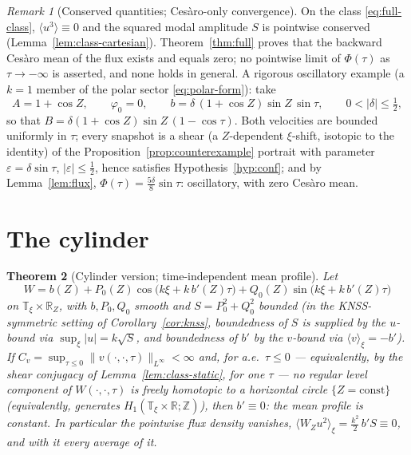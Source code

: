 \documentclass[11pt]{amsart}
\newtheorem{theorem}{Theorem}[section]
\theoremstyle{definition}
\theoremstyle{remark}
\newtheorem{remark}[theorem]{Remark}
\newcommand{\T}{\mathbb{T}}
\newcommand{\R}{\mathbb{R}}
\newcommand{\mean}[1]{\langle #1\rangle}
\begin{document}
\begin{remark}[Conserved quantities; Ces\`aro-only convergence]
\label{rem:consistency}
On the class \eqref{eq:full-class}, $\mean{u^3}\equiv0$ and the squared
modal amplitude $S$ is pointwise conserved (Lemma~\ref{lem:class-cartesian}).
Theorem~\ref{thm:full} proves that the backward Ces\`aro mean of the
flux exists and equals zero; no pointwise limit of $\Phi(\tau)$ as
$\tau\to-\infty$ is asserted, and none holds in general. A rigorous
oscillatory example (a $k=1$ member of the polar sector
\eqref{eq:polar-form}): take
\[
  A=1+\cos Z,\qquad \varphi_0=0,\qquad
  b=\delta\,(1+\cos Z)\sin Z\,\sin\tau,\qquad
  0<|\delta|\le\tfrac12 ,
\]
so that $B=\delta(1+\cos Z)\sin Z\,(1-\cos\tau)$. Both velocities are
bounded uniformly in $\tau$; every snapshot is a shear (a
$Z$-dependent $\xi$-shift, isotopic to the identity) of the
Proposition~\ref{prop:counterexample} portrait with parameter
$\varepsilon=\delta\sin\tau$, $|\varepsilon|\le\tfrac12$, hence
satisfies Hypothesis~\ref{hyp:conf}; and by Lemma~\ref{lem:flux},
$\Phi(\tau)=\tfrac{5\delta}{8}\sin\tau$: oscillatory, with zero
Ces\`aro mean.
\end{remark}

\section{The cylinder}\label{sec:cylinder}

\begin{theorem}[Cylinder version; time-independent mean profile]
\label{thm:cylinder}
Let
\[
  W=b(Z)+P_0(Z)\cos\bigl(k\xi+k\,b'(Z)\tau\bigr)
   +Q_0(Z)\sin\bigl(k\xi+k\,b'(Z)\tau\bigr)
\]
on $\T_\xi\times\R_Z$, with $b,P_0,Q_0$ smooth and $S=P_0^2+Q_0^2$
bounded (in the KNSS-symmetric setting of Corollary~\ref{cor:knss},
boundedness of $S$ is supplied by the $u$-bound via
$\sup_\xi|u|=k\sqrt S$, and boundedness of $b'$ by the $v$-bound via
$\mean{v}_\xi=-b'$). If
$C_v=\sup_{\tau\le0}\|v(\cdot,\cdot,\tau)\|_{L^\infty}<\infty$ and,
for a.e.\ $\tau\le0$ --- equivalently, by the shear conjugacy of
Lemma~\ref{lem:class-static}, for one $\tau$ --- no regular level
component of $W(\cdot,\cdot,\tau)$ is freely homotopic to a horizontal
circle $\{Z=\mathrm{const}\}$ (equivalently, generates
$H_1(\T_\xi\times\R;\mathbb Z)$), then $b'\equiv0$: the mean profile is
constant. In particular the pointwise flux density vanishes,
$\mean{W_Zu^2}_\xi=\tfrac{k^2}2\,b'S\equiv0$, and with it every average
of it.
\end{theorem}
\end{document}
